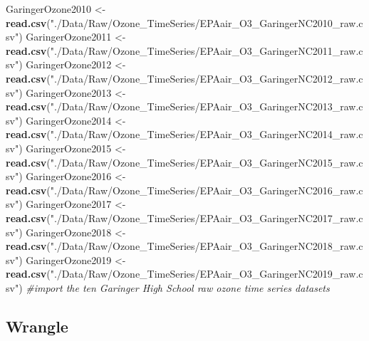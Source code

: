 \documentclass[
]{article}
\newenvironment{Shaded}{\begin{snugshade}}{\end{snugshade}}
\newcommand{\CommentTok}[1]{\textcolor[rgb]{0.56,0.35,0.01}{\textit{#1}}}
\newcommand{\KeywordTok}[1]{\textcolor[rgb]{0.13,0.29,0.53}{\textbf{#1}}}
\newcommand{\NormalTok}[1]{#1}
\newcommand{\StringTok}[1]{\textcolor[rgb]{0.31,0.60,0.02}{#1}}
\begin{document}
\begin{Shaded}
\begin{Highlighting}[]
\NormalTok{GaringerOzone2010 <-}\StringTok{ }
\StringTok{  }\KeywordTok{read.csv}\NormalTok{(}\StringTok{"./Data/Raw/Ozone_TimeSeries/EPAair_O3_GaringerNC2010_raw.csv"}\NormalTok{)}
\NormalTok{GaringerOzone2011 <-}\StringTok{ }
\StringTok{  }\KeywordTok{read.csv}\NormalTok{(}\StringTok{"./Data/Raw/Ozone_TimeSeries/EPAair_O3_GaringerNC2011_raw.csv"}\NormalTok{)}
\NormalTok{GaringerOzone2012 <-}\StringTok{ }
\StringTok{  }\KeywordTok{read.csv}\NormalTok{(}\StringTok{"./Data/Raw/Ozone_TimeSeries/EPAair_O3_GaringerNC2012_raw.csv"}\NormalTok{)}
\NormalTok{GaringerOzone2013 <-}\StringTok{ }
\StringTok{  }\KeywordTok{read.csv}\NormalTok{(}\StringTok{"./Data/Raw/Ozone_TimeSeries/EPAair_O3_GaringerNC2013_raw.csv"}\NormalTok{)}
\NormalTok{GaringerOzone2014 <-}\StringTok{ }
\StringTok{  }\KeywordTok{read.csv}\NormalTok{(}\StringTok{"./Data/Raw/Ozone_TimeSeries/EPAair_O3_GaringerNC2014_raw.csv"}\NormalTok{)}
\NormalTok{GaringerOzone2015 <-}\StringTok{ }
\StringTok{  }\KeywordTok{read.csv}\NormalTok{(}\StringTok{"./Data/Raw/Ozone_TimeSeries/EPAair_O3_GaringerNC2015_raw.csv"}\NormalTok{)}
\NormalTok{GaringerOzone2016 <-}\StringTok{ }
\StringTok{  }\KeywordTok{read.csv}\NormalTok{(}\StringTok{"./Data/Raw/Ozone_TimeSeries/EPAair_O3_GaringerNC2016_raw.csv"}\NormalTok{)}
\NormalTok{GaringerOzone2017 <-}\StringTok{ }
\StringTok{  }\KeywordTok{read.csv}\NormalTok{(}\StringTok{"./Data/Raw/Ozone_TimeSeries/EPAair_O3_GaringerNC2017_raw.csv"}\NormalTok{)}
\NormalTok{GaringerOzone2018 <-}\StringTok{ }
\StringTok{  }\KeywordTok{read.csv}\NormalTok{(}\StringTok{"./Data/Raw/Ozone_TimeSeries/EPAair_O3_GaringerNC2018_raw.csv"}\NormalTok{)}
\NormalTok{GaringerOzone2019 <-}\StringTok{ }
\StringTok{  }\KeywordTok{read.csv}\NormalTok{(}\StringTok{"./Data/Raw/Ozone_TimeSeries/EPAair_O3_GaringerNC2019_raw.csv"}\NormalTok{)}
\CommentTok{#import the ten Garinger High School raw ozone time series datasets}
\end{Highlighting}
\end{Shaded}

\hypertarget{wrangle}{%
\subsection{Wrangle}\label{wrangle}}
\end{document}
